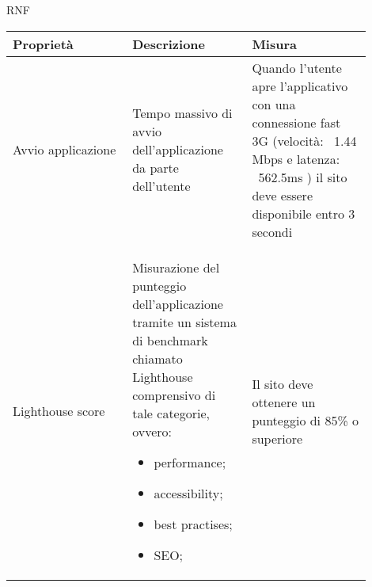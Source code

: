 \begin{listaPersonale}{RNF}
    \begin{tabular}{|p{0.3\linewidth}|p{0.3\linewidth}|p{0.3\linewidth}|}
        \hline
        \rowcolor{viola} \textbf{Proprietà}                           &
        \textbf{Descrizione}                                          &
        \textbf{Misura}                                                 \\
        \hline
        Avvio applicazione                                            &
        Tempo massivo di avvio dell'applicazione da parte dell'utente &
        Quando l'utente apre l'applicativo con una connessione
        fast 3G (velocità: ~1.44 Mbps e latenza: ~562.5ms )
        il sito deve essere disponibile entro 3 secondi                 \\
        \hline
        Lighthouse score                                              &
        Misurazione del punteggio dell'applicazione tramite un
        sistema di benchmark chiamato Lighthouse comprensivo
        di tale categorie, ovvero:
        \begin{itemize}
            \item performance;
            \item accessibility;
            \item best practises;
            \item SEO;
        \end{itemize}                                         &
        Il sito deve ottenere un punteggio di 85\% o superiore          \\
        \hline
    \end{tabular}


\end{listaPersonale}
